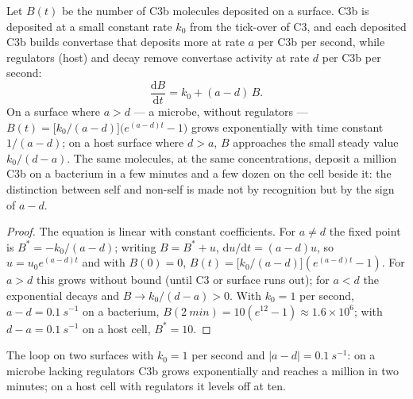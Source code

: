 \begin{theorem}\label{thm:b3:innate-immunity:complement}
Let $B(t)$ be the number of C3b molecules deposited on a surface. C3b
is deposited at a small constant rate $k_{0}$ from the tick-over of
C3, and each deposited C3b builds convertase that deposits more at
rate $a$ per C3b per second, while regulators (host) and decay remove
convertase activity at rate $d$ per C3b per second:
\[
\frac{\mathrm{d}B}{\mathrm{d}t} = k_{0} + (a - d)\,B .
\]
On a surface where $a > d$ --- a microbe, without regulators ---
$B(t) = \bigl[k_{0}/(a-d)\bigr]\bigl(e^{(a-d)t} - 1\bigr)$ grows
exponentially with time constant $1/(a - d)$; on a host surface where
$d > a$, $B$ approaches the small steady value $k_{0}/(d - a)$. The
same molecules, at the same concentrations, deposit a million C3b on a
bacterium in a few minutes and a few dozen on the cell beside it: the
distinction between self and non-self is made not by recognition but by
the sign of $a - d$.
\end{theorem}
\begin{proof}
The equation is linear with constant coefficients. For $a \ne d$ the
fixed point is $B^{*} = -k_{0}/(a-d)$; writing $B = B^{*} + u$,
$\mathrm{d}u/\mathrm{d}t = (a-d)u$, so $u = u_{0}e^{(a-d)t}$ and with
$B(0) = 0$, $B(t) = \bigl[k_{0}/(a-d)\bigr](e^{(a-d)t} - 1)$. For $a > d$
this grows without bound (until C3 or surface runs out); for $a < d$
the exponential decays and $B \to k_{0}/(d-a) > 0$. With $k_{0} = 1$
per second, $a - d = \qty{0.1}{s^{-1}}$ on a bacterium, $B(\qty{2}{min})
= 10(e^{12} - 1) \approx 1.6\times 10^{6}$; with $d - a =
\qty{0.1}{s^{-1}}$ on a host cell, $B^{*} = 10$.
\end{proof}

\begin{omfigure}

{\small The  loop on two surfaces with $k_{0} = 1$ per second
and $|a - d| = \qty{0.1}{s^{-1}}$: on a microbe lacking regulators C3b
grows exponentially and reaches a million in two minutes; on a host
cell with regulators it levels off at ten.}
\end{omfigure}

